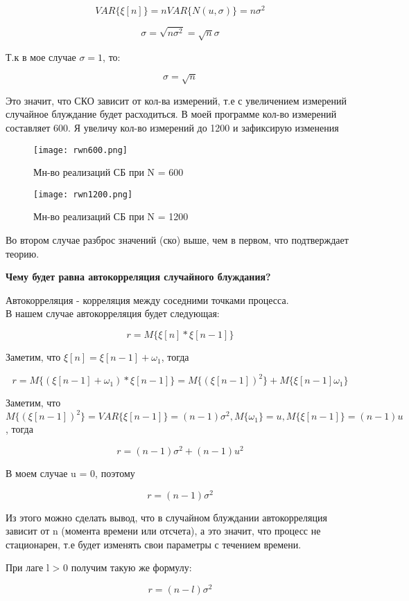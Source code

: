 $$VAR\{\xi[n]\} = nVAR\{N(u, \sigma)\} = n\sigma^2$$

$$\sigma = \sqrt{n\sigma^2} = \sqrt{n}\sigma$$

Т.к в мое случае $\sigma = 1$, то:

$$\sigma = \sqrt{n}$$

Это значит, что СКО зависит от кол-ва измерений, т.е с увеличением измерений случайное блуждание будет расходиться. В моей программе
кол-во измерений составляет 600. Я увеличу кол-во измерений до 1200 и зафиксирую изменения

\begin{figure}[H]
    \centering
    \texttt{[image: rwn600.png]}
    \caption{Мн-во реализаций СБ при N = 600}
\end{figure}

\begin{figure}[H]
    \centering
    \texttt{[image: rwn1200.png]}
    \caption{Мн-во реализаций СБ при N = 1200}
\end{figure}

Во втором случае разброс значений (ско) выше, чем в первом, что подтверждает теорию.

\textbf{Чему будет равна автокорреляция случайного блуждания?}

Автокорреляция - корреляция между соседними точками процесса. \\

В нашем случае автокорреляция будет следующая:

$$r = M\{\xi[n]*\xi[n-1]\}$$

Заметим, что $\xi[n] = \xi[n-1] + \omega_1$, тогда

$$r = M\{(\xi[n-1] + \omega_1)*\xi[n-1]\} = M\{(\xi[n-1])^2\} + M\{\xi[n-1]\omega_1\}$$

Заметим, что $M\{(\xi[n-1])^2\} = VAR\{\xi[n-1]\} = (n-1)\sigma^2, M\{\omega_1\} = u, M\{\xi[n-1]\} = (n-1)u$, тогда

$$r = (n-1)\sigma^2 + (n-1)u^2 $$

В моем случае  u = 0, поэтому

$$r = (n-1)\sigma^2$$

Из этого можно сделать вывод, что в случайном блуждании автокорреляция зависит от n (момента времени или отсчета), а это значит,
что процесс не стационарен, т.е будет изменять свои параметры с течением времени.

При лаге l > 0 получим такую же формулу:

$$r = (n-l)\sigma^2$$

